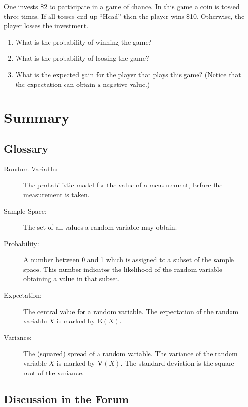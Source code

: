 \documentclass[]{krantz}
\newcommand{\Expec}{\mathbf{E}}
\newcommand{\Var}{\mathbf{V}}
\theoremstyle{definition}
\theoremstyle{definition}
\theoremstyle{definition}
\theoremstyle{remark}
\let\BeginKnitrBlock\begin \let\EndKnitrBlock\end
\begin{document}
\BeginKnitrBlock{exercise}
\protect\hypertarget{exr:unnamed-chunk-51}{}{\label{exr:unnamed-chunk-51} }One invests \$2 to participate in a game of chance.
In this game a coin is tossed three times. If all tosses end up ``Head''
then the player wins \$10. Otherwise, the player losses the investment.

\begin{enumerate}
\def\labelenumi{\arabic{enumi}.}
\item
  What is the probability of winning the game?
\item
  What is the probability of loosing the game?
\item
  What is the expected gain for the player that plays this game?
  (Notice that the expectation can obtain a negative value.)
\end{enumerate}
\EndKnitrBlock{exercise}

\hypertarget{summary-3}{%
\section{Summary}\label{summary-3}}

\hypertarget{glossary}{%
\subsection*{Glossary}\label{glossary}}


\begin{description}
\item[Random Variable:]
The probabilistic model for the value of a measurement, before the
measurement is taken.
\item[Sample Space:]
The set of all values a random variable may obtain.
\item[Probability:]
A number between 0 and 1 which is assigned to a subset of the sample
space. This number indicates the likelihood of the random variable
obtaining a value in that subset.
\item[Expectation:]
The central value for a random variable. The expectation of the
random variable \(X\) is marked by \(\Expec(X)\).
\item[Variance:]
The (squared) spread of a random variable. The variance of the
random variable \(X\) is marked by \(\Var(X)\). The standard deviation
is the square root of the variance.
\end{description}

\hypertarget{discussion-in-the-forum}{%
\subsection*{Discussion in the Forum}\label{discussion-in-the-forum}}
\end{document}
